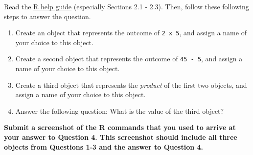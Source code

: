 \documentclass[
]{article}
\begin{document}
Read the \href{https://rpubs.com/yesun/Comm3710_helpwithR}{R help guide}
(especially Sections 2.1 - 2.3). Then, follow these following steps to
answer the question.

\begin{enumerate}
\def\labelenumi{\arabic{enumi}.}
\item
  Create an object that represents the outcome of \texttt{2\ x\ 5}, and
  assign a name of your choice to this object.\\
\item
  Create a second object that represents the outcome of
  \texttt{45\ -\ 5}, and assign a name of your choice to this object.
\item
  Create a third object that represents the \emph{product} of the first
  two objects, and assign a name of your choice to this object.
\item
  Answer the following question: What is the value of the third object?
\end{enumerate}

\textbf{Submit a screenshot of the R commands that you used to arrive at
your answer to Question 4. This screenshot should include all three
objects from Questions 1-3 and the answer to Question 4.}
\end{document}
